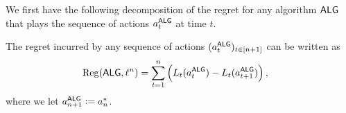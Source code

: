 
    

    

We first have the following decomposition of the regret for any algorithm $\mathsf{ALG}$ that plays the sequence of actions $a^{\mathsf{ALG}}_t$ at time $t$.
\begin{lemma} \label{regret_decomp}
The regret incurred by any sequence of actions $(a^{\mathsf{ALG}}_t)_{t\in[n+1]}$ can be written as
\begin{align}
\mathrm{Reg}(\mathsf{ALG}, \ell^n)
&= \sum_{t=1}^{n} \left(L_t(a^{\mathsf{ALG}}_t) - L_{t}(a^{\mathsf{ALG}}_{t+1}) \right),
\end{align}
where we let $a_{n+1}^{\mathsf{ALG}} := a_n^*$.
\end{lemma}

